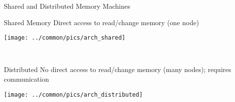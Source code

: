 \begin{frame}
  \begin{block}{Shared and Distributed Memory Machines}
   \begin{center}
    \begin{minipage}{.475\textwidth}
    \begin{block}{Shared Memory}
     Direct access to read/change memory (one node) \vspace{.3cm} \ 
      \begin{center}
      \texttt{[image: ../common/pics/arch\_shared]}
      \end{center}
      \vspace{.3cm} \
    \end{block}
    \end{minipage}
    \hspace{.1cm}
    \begin{minipage}{.475\textwidth}
    \begin{block}{Distributed}
    No direct access to read/change memory (many nodes); requires communication
      \begin{center}
      \texttt{[image: ../common/pics/arch\_distributed]}
      \end{center}
    \end{block}
    \end{minipage}
    \end{center}
    \end{block}
\end{frame}


